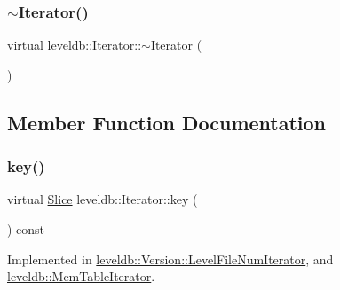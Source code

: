 \mbox{\label{classleveldb_1_1_iterator_a19904cc809b8eb7b3afcddcc38343fa5}} 
\subsubsection{\texorpdfstring{$\sim$Iterator()}{~Iterator()}}
{\footnotesize\ttfamily virtual leveldb\+::\+Iterator\+::$\sim$\+Iterator (\begin{DoxyParamCaption}{ }\end{DoxyParamCaption})\hspace{0.3cm}{\ttfamily [virtual]}}



\subsection{Member Function Documentation}
\mbox{\label{classleveldb_1_1_iterator_ad17feced6e24a1b21db5ae6940c1f220}} 
\subsubsection{\texorpdfstring{key()}{key()}}
{\footnotesize\ttfamily virtual \mbox{\hyperlink{classleveldb_1_1_slice}{Slice}} leveldb\+::\+Iterator\+::key (\begin{DoxyParamCaption}{ }\end{DoxyParamCaption}) const\hspace{0.3cm}{\ttfamily [pure virtual]}}



Implemented in \mbox{\hyperlink{classleveldb_1_1_version_1_1_level_file_num_iterator_af89babdc6efb44a125b9ec597fc96bd8}{leveldb\+::\+Version\+::\+Level\+File\+Num\+Iterator}}, and \mbox{\hyperlink{classleveldb_1_1_mem_table_iterator_a6044613338dfb547fc5148e4b6461d15}{leveldb\+::\+Mem\+Table\+Iterator}}.

